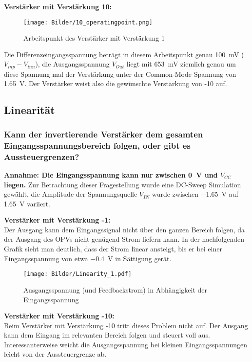 \textbf{Verstärker mit Verstärkung 10:}\\

\begin{figure}[H]
    \centering
    \texttt{[image: Bilder/10\_operatingpoint.png]}
    \caption{Arbeitspunkt des Verstärker mit Verstärkung 1}
    \label{fig:my_label}
\end{figure}

Die Differenzeingangsspannung beträgt in diesem Arbeitspunkt genau \SI{100}{\milli \volt} ($V_{inp}-V_{inn}$), die Ausgangsspannung $V_{Out}$ liegt mit \SI{653}{\milli \volt} ziemlich genau um diese Spannung mal der Verstärkung unter der Common-Mode Spannung von \SI{1.65}{\volt}. Der Verstärker weist also die gewünschte Verstärkung von -10 auf.


\subsection{Linearität}
\subsubsection{Kann der invertierende Verstärker dem gesamten Eingangsspannungsbereich folgen, oder gibt es Aussteuergrenzen?}

\textbf{Annahme: Die Eingangsspannung kann nur zwischen \SI{0}{\volt} und $V_{CC}$ liegen.}
Zur Betrachtung dieser Fragestellung wurde eine DC-Sweep Simulation gewählt, die Amplitude der Spannungsquelle $V_{IN}$ wurde zwischen \SI{-1.65}{\volt} auf \SI{1.65}{\volt} variiert.

\textbf{Verstärker mit Verstärkung -1:}\\

Der Ausgang kann dem Eingangssignal nicht über den ganzen Bereich folgen, da der Ausgang des OPVs nicht genügend Strom liefern kann. In der nachfolgenden Grafik sieht man deutlich, dass der Strom linear ansteigt, bis er bei einer Eingangsspannung von etwa \SI{-0.4}{\volt} in Sättigung gerät.

\begin{figure}[H]
    \centering
    \texttt{[image: Bilder/Linearity\_1.pdf]}
    \caption{Ausgangsspannung (und Feedbackstrom) in Abhängigkeit der Eingangsspannung}
    \label{fig:my_label}
\end{figure}

\textbf{Verstärker mit Verstärkung -10:}\\

Beim Verstärker mit Verstärkung -10 tritt dieses Problem nicht auf. Der Ausgang kann dem Eingang im relevanten Bereich folgen und steuert voll aus. Interessanterweise weicht die Ausgangsspannung bei kleinen Eingangsspannungen leicht von der Aussteuergrenze ab.


